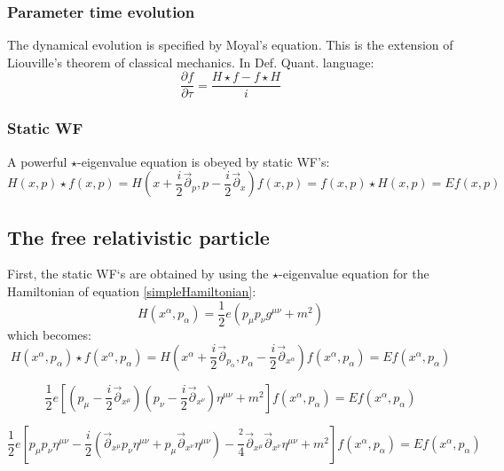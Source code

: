 \documentclass[twoside,a4paper,11pt]{article}
\numberwithin{equation}{section}
\newcommand{\parr}{\overset{\rightarrow}{\partial}}
\begin{document}
\subsubsection{Parameter time evolution}
The dynamical evolution is specified by Moyal's equation. This is the extension of Liouville's theorem of classical mechanics. In Def. Quant. language:
\begin{equation}
    \frac{\partial f}{\partial \tau} = \frac{H \star f - f \star H}{i  }
    \label{parametertimeevolution}
\end{equation}


\subsubsection{Static WF}

A powerful $\star$-eigenvalue equation is obeyed by static WF's:
\begin{equation}
    H(x,p)\star f(x,p) = H(x + \frac{i }{2}\parr_p,p - \frac{i }{2}\parr_x)f(x,p) = f(x,p) \star H(x,p) = Ef(x,p)
\end{equation}


\newpage

\subsection{The free relativistic particle}

First, the static WF`s are obtained by using the $\star$-eigenvalue equation for the Hamiltonian of equation \ref{simpleHamiltonian}:
\begin{equation}
     H(x^\alpha,p_\alpha) = \frac{1}{2} e (p_\mu p _\nu g^{\mu\nu} + m^2)
\end{equation}
which becomes:
\begin{equation}
    H(x^\alpha,p_\alpha) \star f(x^\alpha,p_\alpha) = H \left(x^\alpha + \frac{i }{2} \parr_{p_\alpha}, p_\alpha - \frac{i }{2} \parr_{x^\alpha} \right) f \left(x^\alpha,p_\alpha \right) = E f\left(x^\alpha,p_\alpha \right)
\end{equation}

\begin{equation}
    \frac{1}{2}e \left[ \left( p_\mu - \frac{i }{2} \parr_{x^\mu} \right) \left( p_\nu - \frac{i }{2} \parr_{x^\nu} \right) \eta^{\mu\nu} + m^2 \right] f \left(x^\alpha,p_\alpha \right) = E f\left(x^\alpha,p_\alpha \right)
\end{equation}

\begin{equation}
    \frac{1}{2}e \left[ p_\mu p_\nu \eta^{\mu\nu} - \frac{i }{2} \left( \parr_{x^\mu} p_\nu \eta^{\mu\nu}  +  p_\mu \parr_{x^\nu}\eta^{\mu\nu}\right) - \frac{ ^2}{4}\parr_{x^\mu}\parr_{x^\nu} \eta^{\mu\nu} + m^2 \right] f \left(x^\alpha,p_\alpha \right) = E f\left(x^\alpha,p_\alpha \right)
    \label{THEequation}
\end{equation}
\end{document}
